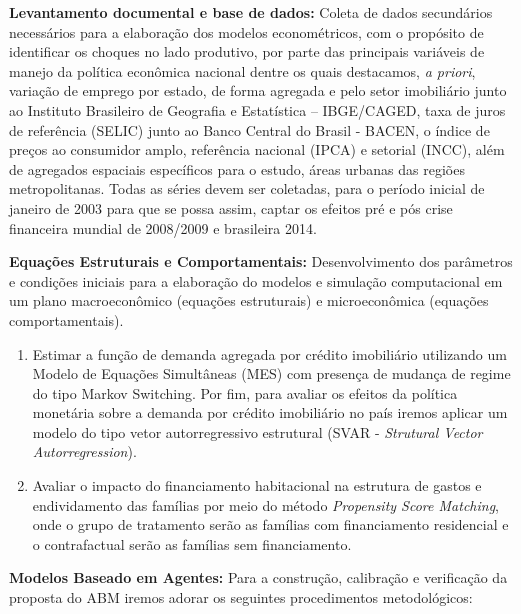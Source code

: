 \textbf{Levantamento documental e base de dados:} Coleta de dados secundários necessários para a elaboração dos modelos econométricos, com o propósito de identificar os choques no lado produtivo, por parte das principais variáveis de manejo da política econômica nacional dentre os quais destacamos, \textit{a priori}, variação de emprego por estado, de forma agregada e pelo setor imobiliário junto ao Instituto Brasileiro de Geografia e Estatística – IBGE/CAGED, taxa de juros de referência (SELIC) junto ao Banco Central do Brasil - BACEN, o índice de preços ao consumidor amplo, referência nacional (IPCA) e setorial (INCC), além de agregados espaciais específicos para o estudo, áreas urbanas das regiões metropolitanas. Todas as séries devem ser coletadas, para o período inicial de janeiro de 2003 para que se possa assim, captar os efeitos pré e pós crise financeira mundial de 2008/2009 e brasileira 2014.

\textbf{Equações Estruturais e Comportamentais:} Desenvolvimento dos parâmetros e condições iniciais para a elaboração do modelos e simulação computacional em um plano macroeconômico (equações estruturais) e microeconômica (equações comportamentais). 

\begin{enumerate}
	\item Estimar a função de demanda agregada por crédito imobiliário utilizando um Modelo de Equações Simultâneas (MES) com presença de mudança de regime do tipo Markov Switching. Por fim, para avaliar os efeitos da política monetária sobre a demanda por crédito imobiliário no país iremos aplicar um modelo do tipo vetor autorregressivo estrutural (SVAR - \textit{Strutural Vector Autorregression}).
	
	\item Avaliar o impacto do financiamento habitacional na estrutura de gastos e endividamento das famílias por meio do método \textit{Propensity Score Matching}, onde o grupo de tratamento serão as famílias com financiamento residencial e o contrafactual serão as famílias sem financiamento.
	
\end{enumerate}


\textbf{Modelos Baseado em Agentes:} Para a construção, calibração e verificação da proposta do ABM iremos adorar os seguintes procedimentos metodológicos:

